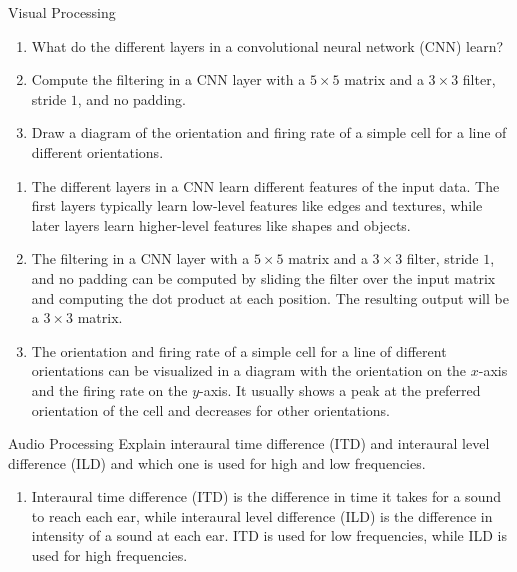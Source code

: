\documentclass{article}
\begin{document}
\begin{exercise}{Visual Processing}
  \begin{enumerate}
    \item What do the different layers in a convolutional neural network (CNN) learn?
    \item Compute the filtering in a CNN layer with a $5 \times 5$ matrix and a $3 \times 3$ filter, stride $1$, and no padding.
    \item Draw a diagram of the orientation and firing rate of a simple cell for a line of different orientations.
  \end{enumerate}

  \begin{solution}
    \begin{enumerate}
      \item The different layers in a CNN learn different features of the input data. The first layers typically learn low-level features like edges and textures, while later layers learn higher-level features like shapes and objects.
      \item The filtering in a CNN layer with a $5 \times 5$ matrix and a $3 \times 3$ filter, stride $1$, and no padding can be computed by sliding the filter over the input matrix and computing the dot product at each position. The resulting output will be a $3 \times 3$ matrix.
      \item The orientation and firing rate of a simple cell for a line of different orientations can be visualized in a diagram with the orientation on the $x$-axis and the firing rate on the $y$-axis. It usually shows a peak at the preferred orientation of the cell and decreases for other orientations.
    \end{enumerate}
  \end{solution}
\end{exercise}

\begin{exercise}{Audio Processing}
  Explain interaural time difference (ITD) and interaural level difference (ILD) and which one is used for high and low frequencies.

  \begin{solution}
    \begin{enumerate}
      \item Interaural time difference (ITD) is the difference in time it takes for a sound to reach each ear, while interaural level difference (ILD) is the difference in intensity of a sound at each ear. ITD is used for low frequencies, while ILD is used for high frequencies.
    \end{enumerate}
  \end{solution}
\end{exercise}
\end{document}
